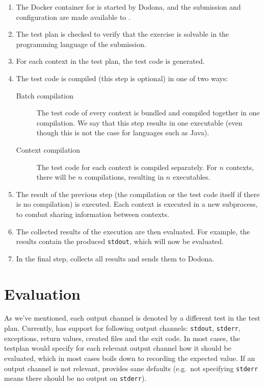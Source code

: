 \begin{multicols}{2}
    \begin{enumerate}
        \item The Docker container for \tested{} is started by Dodona, and the submission and configuration are made available to \tested{}.
        \item The test plan is checked to verify that the exercise is solvable in the programming language of the submission.
        \item For each context in the test plan, the test code is generated.
        \item The test code is compiled (this step is optional) in one of two ways:
        \begin{description}
            \item[Batch compilation] The test code of every context is bundled and compiled together in one compilation.
            We say that this step results in one executable (even though this is not the case for languages such as Java).
            \item[Context compilation] The test code for each context is compiled separately.
            For $n$ contexts, there will be $n$ compilations, resulting in $n$ executables.
        \end{description}
        \item The result of the previous step (the compilation or the test code itself if there is no compilation) is executed.
        Each context is executed in a new subprocess, to combat sharing information between contexts.
        \item The collected results of the execution are then evaluated.
        For example, the results contain the produced \texttt{stdout}, which will now be evaluated.
        \item In the final step, \tested{} collects all results and sends them to Dodona. 
    \end{enumerate}
    
    \section{Evaluation}\label{sec:extended-evaluation}
    
    As we've mentioned, each output channel is denoted by a different test in the test plan.
    Currently, \tested{} has support for following output channels: \texttt{stdout}, \texttt{stderr}, exceptions, return values, created files and the exit code.
    In most cases, the testplan would specify for each relevant output channel how it should be evaluated, which in most cases boils down to recording the expected value.
    If an output channel is not relevant, \tested{} provides sane defaults (e.g.\ not specifying \texttt{stderr} means there should be no output on \texttt{stderr}).
    

\end{multicols}
